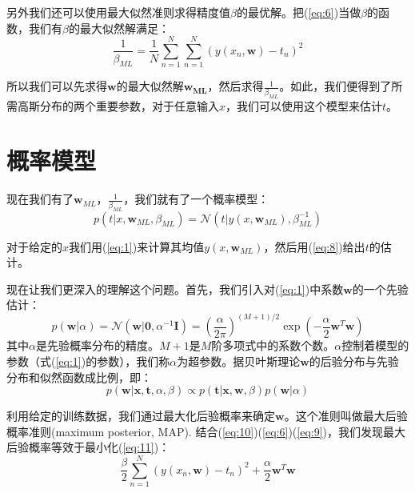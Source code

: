 \documentclass[10pt,a4paper,UTF8]{article}
\begin{document}
另外我们还可以使用最大似然准则求得精度值\(\beta\)的最优解。把(\ref{eq:6})当做\(\beta\)的函数，我们有\(\beta\)的最大似然解满足：
\begin{equation}
\label{eq:7}
\frac{1}{\beta_{ML}} = \frac{1}{N}\sum_{n=1}^{N} \sum_{n=1}^{N}(y(x_{n}, \mathbf{w}) - t_{n})^{2}
\end{equation}

所以我们可以先求得\(\mathbf{w}\)的最大似然解\(\mathbf{w_{ML}}\)，然后求得\(\frac{1}{\beta_{ML}}\)。如此，我们便得到了所需高斯分布的两个重要参数，对于任意输入\(x\)，我们可以使用这个模型来估计\(t\)。
\section{概率模型}
\label{sec:orgdc673e7}


现在我们有了\(\mathbf{w}_{ML}\)，\(\frac{1}{\beta_{ML}}\)，我们就有了一个概率模型：
\begin{equation}
\label{eq:8}
p(t|x, \mathbf{w}_{ML}, \beta_{ML}) = \mathcal{N}(t| y(x, \mathbf{w}_{ML}), \beta_{ML}^{-1} )
\end{equation}

对于给定的\(x\)我们用(\ref{eq:1})来计算其均值\(y(x, \mathbf{w}_{ML})\)，然后用(\ref{eq:8})给出\(t\)的估计。

现在让我们更深入的理解这个问题。首先，我们引入对(\ref{eq:1})中系数\(\mathbf{w}\)的一个先验估计：
\begin{equation}
\label{eq:9}
p( \mathbf{w} | \alpha) = \mathcal{N}( \mathbf{w} | \mathbf{0}, \alpha^{-1} \mathbf{I}) = (\frac{ \alpha}{ 2\pi})^{(M+1)/2} \exp(-\frac{\alpha}{2} \mathbf{w}^{T} \mathbf{w})
\end{equation}
其中\(\alpha\)是先验概率分布的精度。\(M+1\)是\(M\)阶多项式中的系数个数。\(\alpha\)控制着模型的参数（式(\ref{eq:1})的参数），我们称\(\alpha\)为超参数。据贝叶斯理论\(\mathbf{w}\)的后验分布与先验分布和似然函数成比例，即：
\begin{equation}
\label{eq:10}
p(\mathbf{w} | \mathbf{x},\mathbf{t}, \alpha,\beta) \propto p( \mathbf{t} | \mathbf{x}, \mathbf{w},\beta)p( \mathbf{w} | \alpha)
\end{equation}

利用给定的训练数据，我们通过最大化后验概率来确定\(\mathbf{w}\)。这个准则叫做最大后验概率准则(maximum posterior, MAP).  结合(\ref{eq:10})(\ref{eq:6})(\ref{eq:9})，我们发现最大后验概率等效于最小化(\ref{eq:11})：
\begin{equation}
\label{eq:11}
\frac{\beta}{2}\sum_{n=1}^{N} (y(x_{n}, \mathbf{w}) - t_{n} )^{2} + \frac{\alpha}{2} \mathbf{w}^{T} \mathbf{w}
\end{equation}
\end{document}

